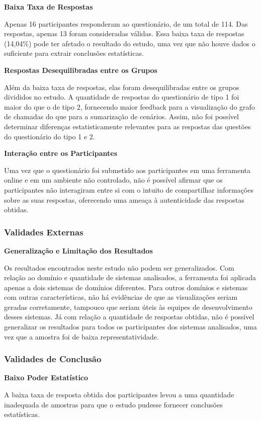 \noindent \textbf{Baixa Taxa de Respostas}

Apenas 16 participantes responderam ao questionário, de um total de 114. Das respostas, apenas 13 foram consideradas válidas. Essa baixa taxa de respostas (14,04\%) pode ter afetado o resultado do estudo, uma vez que não houve dados o suficiente para extrair conclusões estatísticas.

\noindent \textbf{Respostas Desequilibradas entre os Grupos}

Além da baixa taxa de respostas, elas foram desequilibradas entre os grupos divididos no estudo. A quantidade de respostas do questionário de tipo 1 foi maior do que o de tipo 2, fornecendo maior feedback para a visualização do grafo de chamadas do que para a sumarização de cenários. Assim, não foi possível determinar diferenças estatisticamente relevantes para as respostas das questões do questionário do tipo 1 e 2.

\noindent \textbf{Interação entre os Participantes}

Uma vez que o questionário foi submetido aos participantes em uma ferramenta online e em um ambiente não controlado, não é possível afirmar que os participantes não interagiram entre si com o intuito de compartilhar informações sobre as suas respostas, oferecendo uma ameaça à autenticidade das respostas obtidas.

\subsubsection{Validades Externas}

\noindent \textbf{Generalização e Limitação dos Resultados}

Os resultados encontrados neste estudo não podem ser generalizados. Com relação ao domínio e quantidade de sistemas analisados, a ferramenta foi aplicada apenas a dois sistemas de domínios diferentes. Para outros domínios e sistemas com outras características, não há evidências de que as visualizações seriam geradas corretamente, tampouco que seriam úteis às equipes de desenvolvimento desses sistemas. Já com relação a quantidade de respostas obtidas, não é possível generalizar os resultados para todos os participantes dos sistemas analisados, uma vez que a amostra foi de baixa representatividade.

\subsubsection{Validades de Conclusão}

\noindent \textbf{Baixo Poder Estatístico}

A baixa taxa de resposta obtida dos participantes levou a uma quantidade inadequada de amostras para que o estudo pudesse fornecer conclusões estatísticas. 